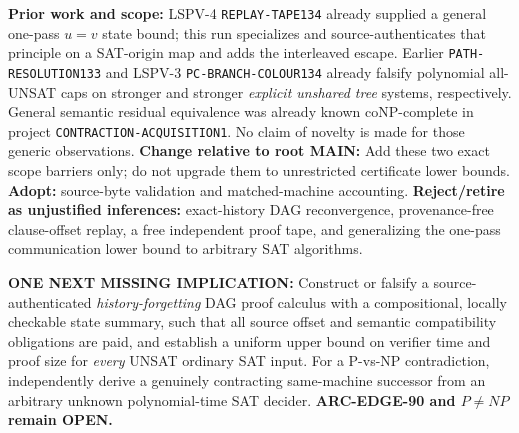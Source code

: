 \documentclass[11pt]{article}
\begin{document}
\textbf{Prior work and scope:} LSPV-4 \texttt{REPLAY-TAPE134} already supplied a general one-pass \(u=v\) state bound; this run specializes and source-authenticates that principle on a SAT-origin map and adds the interleaved escape. Earlier \texttt{PATH-RESOLUTION133} and LSPV-3 \texttt{PC-BRANCH-COLOUR134} already falsify polynomial all-UNSAT caps on stronger and stronger \emph{explicit unshared tree} systems, respectively. General semantic residual equivalence was already known coNP-complete in project \texttt{CONTRACTION-ACQUISITION1}. No claim of novelty is made for those generic observations. \textbf{Change relative to root MAIN:} Add these two exact scope barriers only; do not upgrade them to unrestricted certificate lower bounds. \textbf{Adopt:} source-byte validation and matched-machine accounting. \textbf{Reject/retire as unjustified inferences:} exact-history DAG reconvergence, provenance-free clause-offset replay, a free independent proof tape, and generalizing the one-pass communication lower bound to arbitrary SAT algorithms.

\textbf{ONE NEXT MISSING IMPLICATION:} Construct or falsify a source-authenticated \emph{history-forgetting} DAG proof calculus with a compositional, locally checkable state summary, such that all source offset and semantic compatibility obligations are paid, and establish a uniform upper bound on verifier time and proof size for \emph{every} UNSAT ordinary SAT input. For a P-vs-NP contradiction, independently derive a genuinely contracting same-machine successor from an arbitrary unknown polynomial-time SAT decider. \textbf{ARC-EDGE-90 and \(P\ne NP\) remain OPEN.}


\end{document}
